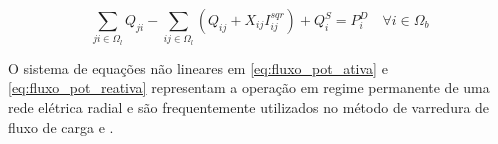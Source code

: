 \begin{equation}
    \sum_{ji\in\Omega_{l}}Q_{ji} - \sum_{ij\in\Omega_{l}}(Q_{ij} + X_{ij}I_{ij}^{sqr}) + Q_{i}^{S} = P_{i}^{D}\quad\forall i \in\Omega_{b}\label{eq:fluxo_pot_reativa}
\end{equation}

O sistema de equações não lineares em \ref{eq:fluxo_pot_ativa} e \ref{eq:fluxo_pot_reativa} representam a operação em regime permanente de uma rede elétrica radial e são frequentemente utilizados no método de varredura de fluxo de carga \cite{Shirmohammadi1988ANetworks} e \cite{Cespedes1990NewNetworks}.